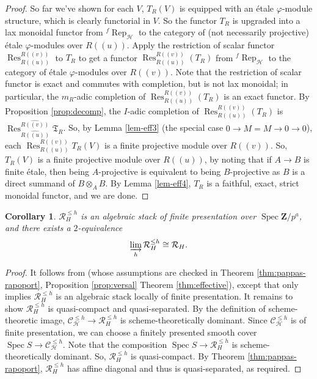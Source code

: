 \documentclass[11pt]{amsart}
\newtheorem{cor}{Corollary}
\numberwithin{thm}{section}
\numberwithin{lem}{section}
\numberwithin{cor}{section}
\numberwithin{prop}{section}
\numberwithin{exam}{section}
\numberwithin{dfn}{section}
\newcommand{\wh}[1]{\widehat{#1}}
\newcommand{\frep}{^f\operatorname{Rep}}
\newcommand{\Res}{\operatorname{Res}}
\newcommand{\spec}{\operatorname{Spec}}
\newcommand{\cC}{\mathcal{C}}
\newcommand{\fT}{\mathfrak{T}}
\newcommand{\calR}{\mathcal{R}}
\newcommand{\clR}{\mathcal{R}}
\newcommand{\clH}{\mathcal{H}}
\newcommand{\Z}{\mathbf{Z}}
\begin{document}
\begin{proof}
So far we've shown for each $V$,
$T_R(V)$ is equipped with an \'etale $\varphi$-module
structure,
which is clearly functorial in $V$.
So the functor $T_R$ is upgraded into
a lax monoidal functor from
$\frep_{\clH}$
to the category of
(not necessarily projective) \'etale $\varphi$-modules
over $R(\!(u)\!)$.
Apply the restriction of scalar functor
$\Res_{R(\!(u)\!)}^{R(\!(v)\!)}$
to $T_R$
to get a functor $\Res_{R(\!(u)\!)}^{R(\!(v)\!)}(T_R)$ from
$\frep_{\clH}$
to the category of
\'etale $\varphi$-modules
over $R(\!(v)\!)$.
Note that the restriction of scalar functor
is exact and commutes with completion, but is not lax monoidal;
in particular, the $m_R$-adic completion
of $\Res_{R(\!(u)\!)}^{R(\!(v)\!)}(T_R)$
is an exact functor.
By Proposition \ref{prop:decomp},
the $I$-adic completion of $\Res_{R(\!(u)\!)}^{R(\!(v)\!)}(T_R)$
is $\Res_{\wh {R(\!(u)\!)}}^{\wh {R(\!(v)\!)}}\fT_R$.
So, by Lemma \ref{lem-eff3} (the special case $0\to M=M\to 0\to 0$),
each $\Res_{R(\!(u)\!)}^{R(\!(v)\!)}T_R(V)$ is a finite projective module over $R(\!(v)\!)$.
So, $T_R(V)$ is a finite projective module over $R(\!(u)\!)$,
by noting that if $A\to B$ is finite \'etale, then
being $A$-projective is equivalent to being $B$-projective
as $B$ is a direct summand of $B\otimes_AB$.
By Lemma \ref{lem-eff4}, $T_R$
is a faithful, exact, strict monoidal functor,
and we are done.
\end{proof}

\begin{cor}
\label{thm:RG}
$\calR_{H}^{\le h}$ is an algebraic stack
of finite presentation over $\spec \Z/p^a$,
and there exists a $2$-equivalence
\[
\varinjlim_h \clR_H^{\le h}
\cong \clR_H.
\]
\end{cor}

\begin{proof}
It follows from \cite[Theorem 1.1.1]{EG21}
(whose assumptions are checked in
Theorem \ref{thm:pappas-rapoport},
Proposition \ref{prop:versal}
Theorem \ref{thm:effective}),
except that
\cite[Theorem 1.1.1]{EG21}
only implies $\mathcal{R}_{H}^{\le h}$
is an algebraic stack locally of
finite presentation.
It remains to show
$\mathcal{R}_{H}^{\le h}$
is quasi-compact and quasi-separated.
By the definition of scheme-theoretic image,
$\cC_{\clH}^{\le h}\to \clR_{H}^{\le h}$
is scheme-theoretically dominant.
Since $\cC_{\clH}^{\le h}$ is of finite presentation,
we can choose a finitely presented smooth cover
$\spec S\to \cC_{\clH}^{\le h}$.
Note that the composition $\spec S\to \clR_{H}^{\le h}$
is scheme-theoretically dominant.
So, $\clR_H^{\le h}$ is quasi-compact.
By Theorem \ref{thm:pappas-rapoport}, $\mathcal{R}_{H}^{\le h}$
has affine diagonal and thus is
quasi-separated, as required.
\end{proof}
\end{document}
